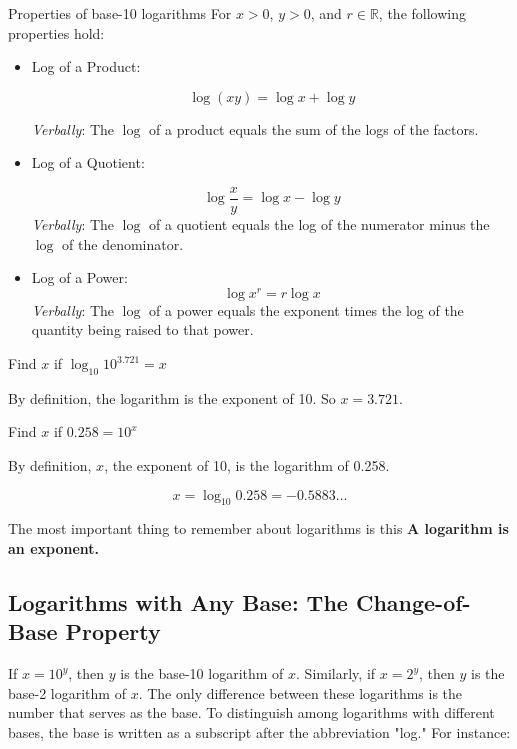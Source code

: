 \begin{custombox}{Properties of base-10 logarithms}
For $x>0$, $y>0$, and $r\in\mathbb{R}$, the following properties hold:
\begin{itemize}
    \item Log of a Product:
    
    \[
    \log(xy)=\log x+\log y
    \]
    
    \textit{Verbally}: The $\log$ of a product equals the sum of the logs of the factors.
    \vspace{0.2cm}
    \item Log of a Quotient:
    
    \[
    \log \frac{x}{y}=\log x-\log y
    \]
    \vspace{0.1cm}
    \textit{Verbally}: The $\log$ of a quotient equals the log of the numerator minus the $\log$ of the denominator.
    \vspace{0.2cm}
    \item Log of a Power:
    \[
    \log x^r=r \log x
    \]
    \textit{Verbally}: The $\log$ of a power equals the exponent times the log of the quantity being raised to that power.
\end{itemize}

   
\end{custombox}

\begin{example} Find $x$ if $\log_{10} 10^{3.721}=x$

\begin{solution}
By definition, the logarithm is the exponent of 10. So $x=3.721$.
\end{solution}
\end{example}

\begin{example} Find $x$ if $0.258=10^x$

\begin{solution}
   By definition, $x$, the exponent of 10, is the logarithm of 0.258.

    \[
    x=\log_{10} 0.258=-0.5883 \ldots
    \]
\end{solution}
    
\end{example}

\begin{custombox}{The most important thing to remember about logarithms is this}
    \textbf{A logarithm is an exponent.}
\end{custombox}

\subsection*{Logarithms with Any Base: The Change-of-Base Property}
If \(x = 10^y\), then \(y\) is the base-10 logarithm of \(x\). Similarly, if \(x = 2^y\), then \(y\) is the base-2 logarithm of \(x\). The only difference between these logarithms is the number that serves as the base. To distinguish among logarithms with different bases, the base is written as a subscript after the abbreviation "log." For instance:

